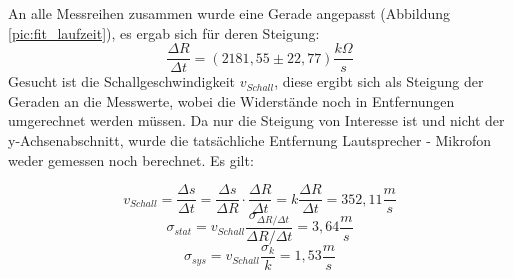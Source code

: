 \documentclass[a4paper]{article}
\begin{document}
	An alle Messreihen zusammen wurde eine Gerade angepasst (Abbildung \ref{pic:fit_laufzeit}), es ergab sich für deren Steigung:
	\begin{equation}
	\frac{\Delta R}{\Delta t} = (2181,55 \pm 22,77) \frac{k\Omega}{s}
	\end{equation} 
	Gesucht ist die Schallgeschwindigkeit $v_{Schall}$, diese ergibt sich als Steigung der Geraden an die Messwerte, wobei die Widerstände noch in Entfernungen umgerechnet werden müssen. Da nur die Steigung von Interesse ist und nicht der y-Achsenabschnitt, wurde die tatsächliche  Entfernung Lautsprecher - Mikrofon weder gemessen noch berechnet. Es gilt:
	
	\begin{equation}
	v_{Schall} = \frac{\Delta s}{\Delta t} = \frac{\Delta s}{\Delta R} \cdot \frac{\Delta R}{\Delta t} = k \frac{\Delta R}{\Delta t} = 352,11 \frac{m}{s}
	\end{equation}
	\begin{equation}
	\sigma_{stat} = v_{Schall} \frac{\sigma _{\Delta R / \Delta t}}{\Delta R / \Delta t} = 3,64 \frac{m}{s}
	\end{equation}
	\begin{equation}
	\sigma_{sys} = v_{Schall} \frac{\sigma _k}{k} = 1,53 \frac{m}{s}
	\end{equation}
	
\end{document}

